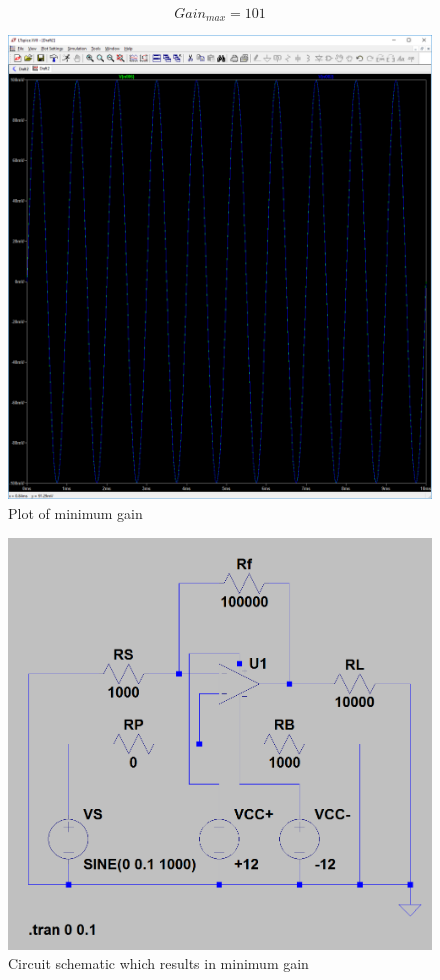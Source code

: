 \documentclass[10pt]{article}
\begin{document}
$$Gain_{max} = 101$$
\begin{figure}[H]
	\centering
	\includegraphics[width=\textwidth]{PreLab3a1.PNG}
	\caption{Plot of minimum gain}
\end{figure}
\begin{figure}[H]
	\centering
	\includegraphics[width=\textwidth]{0.PNG}
	\caption{Circuit schematic which results in minimum gain}
\end{figure}
\end{document}
